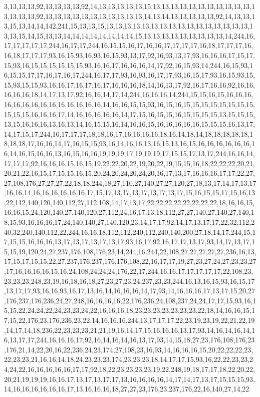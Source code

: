 3,13,13,13,92,13,13,13,13,92,14,13,13,13,13,13,15,13,13,13,13,13,13,13,13,13,13,13,13,13,13,13,92,13,13,13,13,13,13,13,13,13,13,13,14,13,14,13,13,13,13,13,92,14,13,13,13,15,13,14,14,142,241,15,13,13,15,13,13,13,13,13,13,13,13,13,13,13,13,13,13,13,13,13,13,15,14,15,13,13,14,14,14,14,14,14,14,14,15,13,13,13,13,13,13,13,13,13,14,244,16,17,17,17,17,17,244,16,17,17,244,16,15,15,16,17,16,16,17,17,17,17,16,18,17,17,17,16,16,18,17,17,17,93,16,15,93,16,93,16,15,93,13,17,92,16,93,13,17,93,16,16,16,17,15,17,15,93,16,15,15,15,15,15,15,93,16,16,17,16,16,16,14,17,92,16,15,93,14,244,16,15,93,16,15,15,17,17,16,17,16,17,244,16,17,17,93,16,93,16,17,17,93,16,15,17,93,16,15,93,15,15,93,15,15,93,16,16,17,16,17,16,17,16,16,16,18,14,16,13,17,92,16,17,16,16,92,16,16,16,16,16,18,14,17,13,17,92,16,16,14,17,14,244,16,16,16,14,244,15,15,16,15,16,16,16,16,16,16,16,16,16,16,16,16,16,16,14,16,16,15,15,93,16,15,16,15,15,15,15,15,15,15,15,15,15,15,16,16,16,17,14,16,16,16,16,16,14,17,15,16,15,15,16,15,15,15,15,13,15,15,15,13,15,16,16,16,13,16,13,14,16,15,15,16,14,16,16,15,16,16,16,16,16,15,15,15,16,13,17,14,17,15,17,244,16,17,17,17,18,18,16,17,16,16,16,16,18,16,14,18,14,18,18,18,18,18,18,18,18,17,16,16,14,17,16,15,15,93,16,14,16,16,13,16,15,13,16,15,16,16,16,16,16,16,16,14,16,15,16,16,13,16,15,16,16,19,19,19,17,19,19,19,17,15,15,17,13,17,244,16,16,14,17,17,17,92,16,16,16,15,16,15,19,22,22,20,22,19,20,22,19,15,15,16,18,22,22,22,20,21,20,21,22,16,15,17,15,15,16,15,20,24,20,24,20,24,20,16,17,13,17,16,16,16,17,17,22,27,27,108,176,27,27,27,22,18,18,244,18,27,110,27,140,27,27,120,27,18,13,17,14,17,13,17,16,16,14,16,16,16,16,16,16,17,15,17,13,17,13,17,13,17,13,17,15,16,15,15,17,15,16,13,22,112,140,120,140,112,27,112,108,14,17,13,17,22,22,22,22,22,22,22,22,18,16,16,15,16,16,15,24,120,140,27,140,120,27,112,24,16,17,13,18,112,27,27,140,27,140,27,140,18,15,93,16,16,16,17,24,140,140,27,140,120,23,14,17,17,92,14,17,13,17,17,22,32,112,240,32,240,140,112,22,244,16,16,18,112,112,240,112,240,140,200,27,18,14,17,244,15,17,15,15,16,16,16,13,17,13,17,13,17,13,17,93,16,17,92,16,17,17,13,17,93,14,17,13,17,15,15,19,120,24,27,237,176,108,176,23,14,244,16,244,22,108,27,27,27,27,27,236,16,13,17,15,17,15,15,22,27,237,176,237,176,176,108,22,16,17,17,19,27,23,27,24,27,23,23,27,17,16,16,16,16,15,16,24,108,24,24,24,176,22,17,244,16,16,17,17,17,17,17,22,108,23,23,23,23,248,23,19,16,18,16,18,27,23,27,23,24,237,23,23,244,16,13,16,15,93,16,15,17,13,17,17,93,16,16,93,16,17,13,16,14,16,16,16,14,17,93,14,16,16,16,17,13,17,15,20,27,176,237,176,236,24,27,248,16,16,16,16,22,176,236,24,108,237,24,24,17,17,15,93,16,15,15,22,24,24,22,24,23,23,24,22,16,16,16,18,23,23,23,23,23,23,23,22,18,14,16,16,15,17,15,22,176,23,176,236,23,22,14,16,16,16,244,13,17,17,17,22,23,19,23,19,22,21,22,19,14,17,14,18,236,22,23,23,23,21,21,19,16,14,17,15,16,16,16,13,17,93,14,16,14,16,14,16,13,17,17,244,16,16,16,17,92,16,14,16,14,16,13,17,93,14,15,18,27,23,176,108,176,23,176,21,14,22,20,16,22,236,24,23,174,27,108,23,16,93,14,16,16,16,15,20,22,22,22,23,22,23,23,21,16,16,14,18,24,23,23,23,174,23,23,23,18,14,17,17,15,93,16,22,22,23,23,24,24,22,16,16,16,16,16,17,17,92,18,22,23,23,23,23,19,22,248,19,18,17,17,18,22,20,22,20,21,19,19,19,16,16,17,13,17,13,17,17,13,16,16,16,16,14,17,14,17,13,17,15,15,15,93,14,16,16,16,16,16,16,17,13,16,16,16,18,27,27,23,176,23,237,176,22,16,140,27,14,22